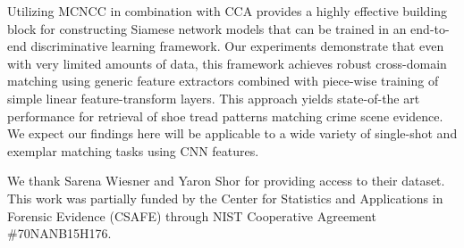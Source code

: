 \documentclass[twocolumn]{svjour3}           %
\begin{document}
Utilizing MCNCC in combination with CCA provides a highly effective building
block for constructing Siamese network models that can be trained in an
end-to-end discriminative learning framework.  Our experiments demonstrate that
even with very limited amounts of data, this framework achieves robust
cross-domain matching using generic feature extractors combined with piece-wise
training of simple linear feature-transform layers. This approach yields
state-of-the art performance for retrieval of shoe tread patterns matching
crime scene evidence.  We expect our findings here will be applicable to a wide
variety of single-shot and exemplar matching tasks using CNN features.

\begin{acknowledgements}
We thank Sarena Wiesner and Yaron Shor for providing access to their dataset. 
This work was partially funded by the Center for Statistics and Applications in
Forensic Evidence (CSAFE) through NIST Cooperative Agreement \#70NANB15H176.
\end{acknowledgements}



\end{document}
